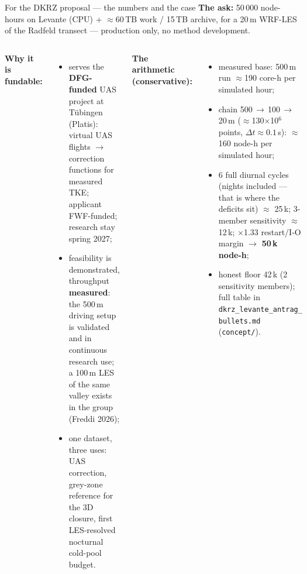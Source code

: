 \documentclass[10pt,aspectratio=169]{beamer}
\begin{document}
\begin{frame}{For the DKRZ proposal --- the numbers and the case}
  \textbf{The ask:} \alert{50\,000 node-hours} on Levante (CPU) +
  $\approx$60\,TB work / 15\,TB archive, for a 20\,m WRF-LES of the Radfeld
  transect --- production only, no method development.
  \vspace{0.5ex}
  \begin{columns}[T]
    \textbf{Why it is fundable:}
    \begin{itemize}
      \item serves the \textbf{DFG-funded} UAS project at Tübingen (Platis):
        virtual UAS flights $\to$ correction functions for measured TKE;
        applicant FWF-funded; research stay spring 2027;
      \item feasibility is demonstrated, throughput \textbf{measured}: the
        500\,m driving setup is validated and in continuous research use;
        a 100\,m LES of the same valley exists in the group (Freddi 2026);
      \item one dataset, three uses: UAS correction, grey-zone reference for
        the 3D closure, first LES-resolved nocturnal cold-pool budget.
    \end{itemize}
    \textbf{The arithmetic (conservative):}
    \begin{itemize}
      \item measured base: 500\,m run $\approx$190 core-h per simulated hour;
      \item chain 500\,$\to$\,100\,$\to$\,20\,m
        ($\approx$130$\times$10$^6$ points, $\Delta t \approx 0.1$\,s):
        $\approx$160 node-h per simulated hour;
      \item 6 full diurnal cycles (nights included --- that is where the
        deficits sit) $\approx$ 25\,k; 3-member sensitivity $\approx$ 12\,k;
        $\times$1.33 restart/I-O margin $\to$ \textbf{50\,k node-h};
      \item honest floor 42\,k (2 sensitivity members); full table in
        \texttt{dkrz\_levante\_antrag\_} \texttt{bullets.md} (\texttt{concept/}).
    \end{itemize}
  \end{columns}
\end{frame}
\end{document}
